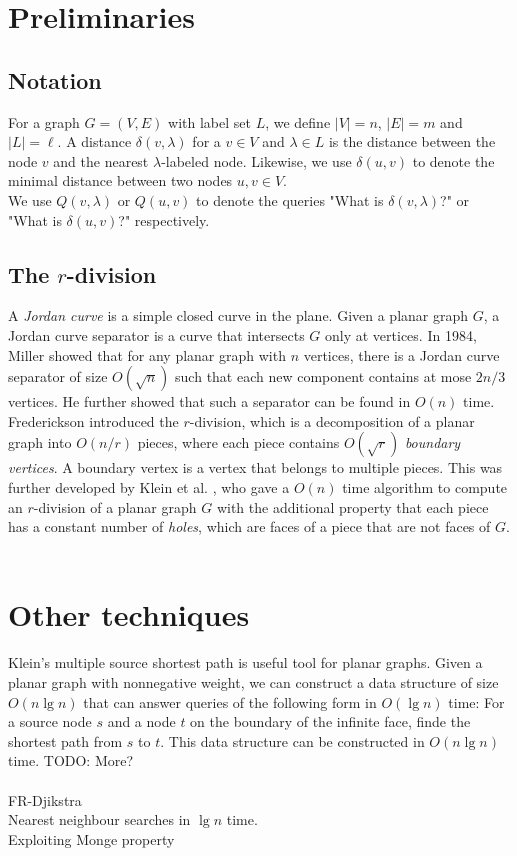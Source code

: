 \section{Preliminaries}
\label{sec:preliminaries}

\subsection{Notation}
For a graph $G=(V,E)$ with label set $L$, we define $|V|=n$, $|E|=m$ and $|L|=\ell$. A
distance $\delta(v,\lambda)$ for a $v\in V$ and $\lambda\in L$ is the distance between
the node $v$ and the nearest $\lambda$-labeled node. Likewise, we use $\delta(u,v)$ to denote
the minimal distance between two nodes $u,v\in V$. \\
We use $Q(v,\lambda)$ or $Q(u,v)$ to denote the queries "What is $\delta(v,\lambda)$?" or
"What is $\delta(u,v)$?" respectively.

\subsection{The $r$-division}
A \textit{Jordan curve} is a simple closed curve in the plane. Given a planar graph $G$,
a Jordan curve separator is a curve that intersects $G$ only at vertices. In 1984, Miller
\cite{miller1984finding} showed that for any planar graph with $n$ vertices, there is a Jordan curve
separator of size $O(\sqrt{n})$ such that each new component contains at mose $2n/3$
vertices. He further showed that such a separator can be found in $O(n)$ time. \\
Frederickson introduced the $r$-division, which is a decomposition of a planar graph into
$O(n/r)$ pieces, where each piece contains $O(\sqrt{r})$ \textit{boundary vertices}. A
boundary vertex is a vertex that belongs to multiple pieces. This was further developed
by Klein et al. \cite{klein2013structured}, who gave a $O(n)$ time algorithm to compute
an $r$-division of a planar graph $G$ with the additional property that each piece has a constant number of \textit{holes}, which are
faces of a piece that are not faces of $G$. \\
\\
\section{Other techniques}
Klein's multiple source shortest path \cite{klein2005multiple} is useful tool for planar
graphs. Given a planar graph with nonnegative weight, we can construct a data structure
of size $O(n \lg n)$ that can answer queries of the following form in $O(\lg n)$ time:
For a source node $s$ and a node $t$ on the boundary of the infinite face, finde the
shortest path from $s$ to $t$. This data structure can be constructed in $O(n \lg n)$
time. TODO: More?\\
\\
FR-Djikstra \cite{fakcharoenphol2006planar}\\
Nearest neighbour searches in $\lg n$ time. \\
Exploiting Monge property

